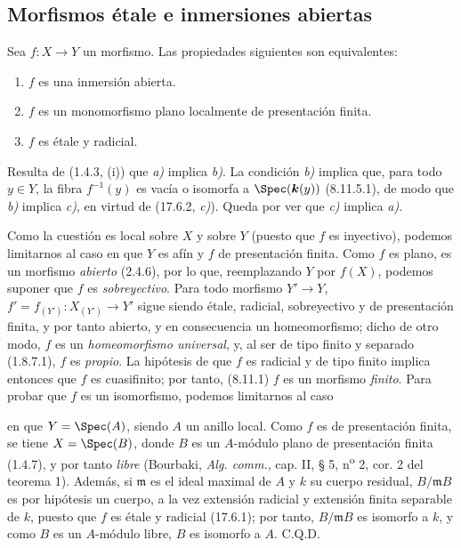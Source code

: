 \subsection{Morfismos étale e inmersiones abiertas}
\label{subsection:IV.17.9}
\label{IV.17.9}

\begin{theorem}[17.9.1]
\label{IV.17.9.1}
Sea $f:X\to Y$ un morfismo. Las propiedades siguientes son equivalentes:
\begin{enumerate}
  \item[\textup{a)}] $f$ es una inmersión abierta.
  \item[\textup{b)}] $f$ es un monomorfismo plano localmente de presentación finita.
  \item[\textup{c)}] $f$ es étale y radicial.
\end{enumerate}
\end{theorem}

Resulta de (1.4.3, (i)) que \emph{a)} implica \emph{b)}. La condición \emph{b)} implica que, para todo $y\in Y$, la fibra $f^{-1}(y)$ es vacía o isomorfa a $\Spec(\boldsymbol k(y))$ (8.11.5.1), de modo que \emph{b)} implica \emph{c)}, en virtud de (17.6.2, \emph{c)}). Queda por ver que \emph{c)} implica \emph{a)}.

Como la cuestión es local sobre $X$ y sobre $Y$ (puesto que $f$ es inyectivo), podemos limitarnos al caso en que $Y$ es afín y $f$ de presentación finita. Como $f$ es plano, es un morfismo \emph{abierto} (2.4.6), por lo que, reemplazando $Y$ por $f(X)$, podemos suponer que $f$ es \emph{sobreyectivo}. Para todo morfismo $Y'\to Y$, $f'=f_{(Y')}:X_{(Y')}\to Y'$ sigue siendo étale, radicial, sobreyectivo y de presentación finita, y por tanto abierto, y en consecuencia un homeomorfismo; dicho de otro modo, $f$ es un \emph{homeomorfismo universal}, y, al ser de tipo finito y separado (1.8.7.1), $f$ es \emph{propio}. La hipótesis de que $f$ es radicial y de tipo finito implica entonces que $f$ es cuasifinito; por tanto, (8.11.1) $f$ es un morfismo \emph{finito}. Para probar que $f$ es un isomorfismo, podemos limitarnos al caso


en que $Y=\Spec(A)$, siendo $A$ un anillo local. Como $f$ es de presentación finita, se tiene $X=\Spec(B)$, donde $B$ es un $A$-módulo plano de presentación finita (1.4.7), y por tanto \emph{libre} (Bourbaki, \emph{Alg. comm.}, cap. II, § 5, n\textsuperscript{o} 2, cor. 2 del teorema 1). Además, si $\mathfrak m$ es el ideal maximal de $A$ y $k$ su cuerpo residual, $B/\mathfrak mB$ es por hipótesis un cuerpo, a la vez extensión radicial y extensión finita separable de $k$, puesto que $f$ es étale y radicial (17.6.1); por tanto, $B/\mathfrak mB$ es isomorfo a $k$, y como $B$ es un $A$-módulo libre, $B$ es isomorfo a $A$. C.Q.D.

